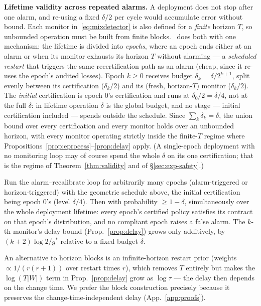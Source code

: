 \textbf{Lifetime validity across repeated alarms.} A deployment does
not stop after one alarm, and re-using a fixed $\delta/2$ per cycle
would accumulate error without bound. Each monitor
in~\eqref{eq:mixdetector} is also defined for a \emph{finite} horizon
$T$, so unbounded operation must be built from finite blocks. \system\
does both with one mechanism: the lifetime is divided into
\emph{epochs}, where an epoch ends either at an alarm or when its
monitor exhausts its horizon $T$ without alarming --- a
\emph{scheduled restart} that triggers the same recertification path
as an alarm (cheap, since it re-uses the epoch's audited losses).
Epoch $k \ge 0$ receives budget $\delta_k = \delta/2^{k+1}$, split
evenly between its certification ($\delta_k/2$) and its (fresh,
horizon-$T$) monitor ($\delta_k/2$). The \emph{initial} certification
is epoch 0's certification and runs at $\delta_0/2 = \delta/4$, not at
the full $\delta$: in lifetime operation $\delta$ is the global
budget, and no stage --- initial certification included --- spends
outside the schedule. Since $\sum_k \delta_k = \delta$, the union
bound over every certification and every monitor holds
over an unbounded horizon, with every monitor operating strictly
inside the finite-$T$ regime where
Propositions~\ref{prop:eprocess}--\ref{prop:delay} apply. (A
single-epoch deployment with no monitoring loop may of course spend
the whole $\delta$ on its one certification; that is the regime of
Theorem~\ref{thm:validity} and of \S\ref{sec:exp-safety}.)

\begin{proposition}
\label{prop:lifetime}
Run the alarm--recalibrate loop for arbitrarily many epochs
(alarm-triggered or horizon-triggered) with the
geometric schedule above, the initial certification being epoch 0's
(level $\delta/4$). Then with probability $\ge 1-\delta$,
simultaneously over the whole deployment lifetime: every epoch's
certified policy satisfies its contract on that epoch's distribution,
and no compliant epoch raises a false alarm. The $k$-th monitor's delay
bound (Prop.~\ref{prop:delay}) grows only additively, by
$(k+2)\log 2 / g^\ast$ relative to a fixed budget $\delta$.
\end{proposition}

An alternative to horizon blocks is an infinite-horizon restart prior
(weights $\propto 1/(r(r+1))$ over restart times $r$), which removes
$T$ entirely but makes the $\log(T|W|)$ term in
Prop.~\ref{prop:delay} grow as $\log \tau$ --- the delay then depends
on the change time. We prefer the block construction precisely because
it preserves the change-time-independent delay
(App.~\ref{app:proofs}).

